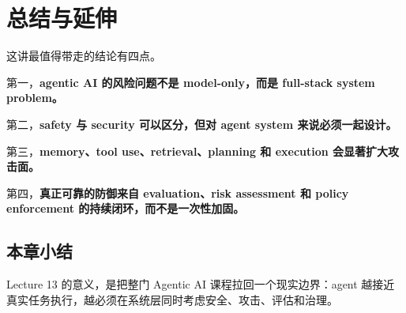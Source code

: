 \documentclass[a4paper]{article}
\begin{document}
\section{总结与延伸}
这讲最值得带走的结论有四点。

第一，\textbf{agentic AI 的风险问题不是 model-only，而是 full-stack system problem。}

第二，\textbf{safety 与 security 可以区分，但对 agent system 来说必须一起设计。}

第三，\textbf{memory、tool use、retrieval、planning 和 execution 会显著扩大攻击面。}

第四，\textbf{真正可靠的防御来自 evaluation、risk assessment 和 policy enforcement 的持续闭环，而不是一次性加固。}

\subsection{本章小结}
Lecture 13 的意义，是把整门 Agentic AI 课程拉回一个现实边界：agent 越接近真实任务执行，越必须在系统层同时考虑安全、攻击、评估和治理。
\end{document}
